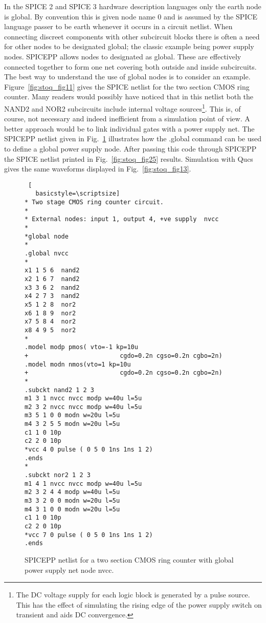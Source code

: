 In the SPICE 2 and SPICE 3 hardware description languages only the earth node is global. By convention this is given node name 0 and is assumed by the SPICE language passer to be earth whenever it occurs in a circuit netlist. When connecting discreet components with other subcircuit blocks there is often a need for other nodes to be designated global; the classic example being power supply nodes.  SPICEPP allows nodes to designated as global. These are effectively connected together to form one net covering both outside and inside subcircuits.  The best way to understand the use of global nodes is to consider an example. Figure~\ref{fig:stoq_fig11} gives the SPICE netlist for the two section CMOS ring counter. Many readers would possibly have noticed that in this netlist both the NAND2 and NOR2 subcircuits include internal voltage sources\footnote{The DC voltage supply for each logic block is generated by a pulse source. This has the effect of simulating the rising edge of the power supply switch on transient and aids DC convergence.}. This is, of course, not necessary and indeed inefficient from a simulation point of view. A better approach would be to link individual gates with a power supply net.  The SPICEPP netlist given in Fig.~\ref{fig:stoq_fig24} illustrates how the .global command can be used to define a global power supply node.  After passing this code through SPICEPP the SPICE netlist printed in Fig.~\ref{fig:stoq_fig25} results. Simulation with Qucs gives the same waveforms displayed in Fig.~\ref{fig:stoq_fig13}.
 
\begin{figure}
 \begin{lstlisting} [
   basicstyle=\scriptsize]   
* Two stage CMOS ring counter circuit.
*
* External nodes: input 1, output 4, +ve supply  nvcc
*
*global node
*
.global nvcc
*
x1 1 5 6  nand2
x2 1 6 7  nand2
x3 3 6 2  nand2
x4 2 7 3  nand2
x5 1 2 8  nor2
x6 1 8 9  nor2
x7 5 8 4  nor2
x8 4 9 5  nor2
*
.model modp pmos( vto=-1 kp=10u
+                         cgdo=0.2n cgso=0.2n cgbo=2n)
.model modn nmos(vto=1 kp=10u
+                         cgdo=0.2n cgso=0.2n cgbo=2n)
*
.subckt nand2 1 2 3 
m1 3 1 nvcc nvcc modp w=40u l=5u
m2 3 2 nvcc nvcc modp w=40u l=5u
m3 5 1 0 0 modn w=20u l=5u
m4 3 2 5 5 modn w=20u l=5u
c1 1 0 10p
c2 2 0 10p
*vcc 4 0 pulse ( 0 5 0 1ns 1ns 1 2)
.ends
*
.subckt nor2 1 2 3
m1 4 1 nvcc nvcc modp w=40u l=5u
m2 3 2 4 4 modp w=40u l=5u
m3 3 2 0 0 modn w=20u l=5u
m4 3 1 0 0 modn w=20u l=5u
c1 1 0 10p
c2 2 0 10p
*vcc 7 0 pulse ( 0 5 0 1ns 1ns 1 2)
.ends
\end{lstlisting} 
 \caption{SPICEPP netlist for a two section CMOS ring counter with global power supply net node nvcc.}
\label{fig:stoq_fig24}
\end{figure}   

